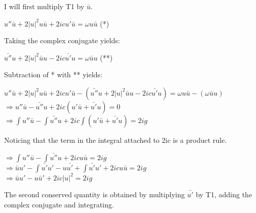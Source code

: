 \documentclass[12pt]{article}
\begin{document}
I will first multiply T1 by $\bar{u}$. \\ 
\begin{center}
$  u''\bar{u} + 2|u|^{2}u \bar{u}+2icu' \bar{u}=\omega u \bar{u}$ (*) \\ 
\end{center}
Taking the complex conjugate yields: \\ 
\begin{center}
$ \bar{u''} u + 2|u|^{2} \bar{u} u -2ic\bar{u'}u = \omega \bar{u} u$ (**) \\ 
\end{center} 
Subtraction of * with ** yields: \\ 
\begin{center} 
$  u''\bar{u} + 2|u|^{2}u \bar{u}+2icu' \bar{u} - (\bar{u''} u + 2|u|^{2} 
\bar{u} u -2ic\bar{u'}u) =\omega u \bar{u} - (\omega \bar{u} u)$\\ 
$ \Rightarrow  u''\bar{u} - \bar{u''} u + 2ic (u' \bar{u} + \bar{u'}u ) = 0$ \\
$ \Rightarrow \int u''\bar{u} - \int \bar{u''} u + 2ic \int (u' \bar{u} + 
\bar{u'}u ) = 2ig  $ \\  
\end{center} 
Noticing that the term in the integral attached to 2ic is a product rule.\\ 
\begin{center}
$ \Rightarrow \int u''\bar{u} - \int \bar{u''} u + 2icu \bar{u} = 2ig $ \\
$ \Rightarrow \bar{u}u' - \int \bar{u'} u' - u \bar{u'} + \int \bar{u'} u' + 
2icu \bar{u} = 2ig$ \\ 
$ \Rightarrow \bar{u}u' - u\bar{u}' + 2ic|u|^{2} = 2ig$ \\ 
\end{center} 
The second conserved quantity is obtained by multiplying $\bar{u'}$ by T1, 
adding the complex conjugate and integrating. \\ 
\end{document}
